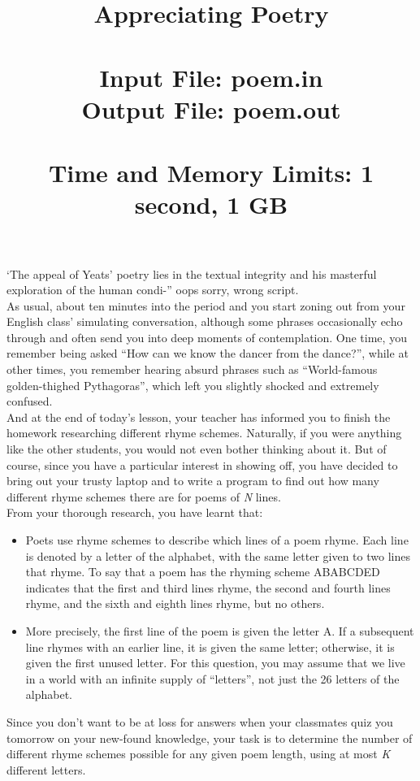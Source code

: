 \documentclass{article}
\title{\textbf{Appreciating Poetry} \\
	\ \\
	\large \textbf{Input File:} poem.in \\
	\large \textbf{Output File:} poem.out \\
	\ \\
	\textbf{Time and Memory Limits:} 1 second, 1 GB}
\date{\vspace{-10ex}}
\begin{document}
\maketitle
	
‘The appeal of Yeats’ poetry lies in the textual integrity and his masterful exploration of the human condi-” oops sorry, wrong script. \\

As usual, about ten minutes into the period and you start zoning out from your English class’ simulating conversation, although some phrases occasionally echo through and often send you into deep moments of contemplation. One time, you remember being asked “How can we know the dancer from the dance?”, while at other times, you remember hearing absurd phrases such as “World-famous golden-thighed Pythagoras”, which left you slightly shocked and extremely confused. \\

And at the end of today’s lesson, your teacher has informed you to finish the homework researching different rhyme schemes. Naturally, if you were anything like the other students, you would not even bother thinking about it. But of course, since you have a particular interest in showing off, you have decided to bring out your trusty laptop and to write a program to find out how many different rhyme schemes there are for poems of \emph{N} lines. \\

From your thorough research, you have learnt that:
\begin{itemize}
	\item Poets use rhyme schemes to describe which lines of a poem rhyme. Each line is denoted by a letter of the alphabet, with the same letter given to two lines that rhyme. To say that a poem has the rhyming scheme ABABCDED indicates that the first and third lines rhyme, the second and fourth lines rhyme, and the sixth and eighth lines rhyme, but no others. 
	
	\item More precisely, the first line of the poem is given the letter A. If a subsequent line rhymes with an earlier line, it is given the same letter; otherwise, it is given the first unused letter. For this question, you may assume that we live in a world with an infinite supply of “letters”, not just the 26 letters of the alphabet. \\
\end{itemize}

Since you don't want to be at loss for answers when your classmates quiz you tomorrow on your new-found knowledge, your task is to determine the number of different rhyme schemes possible for any given poem length, using at most \emph{K} different letters. \\
\end{document}
